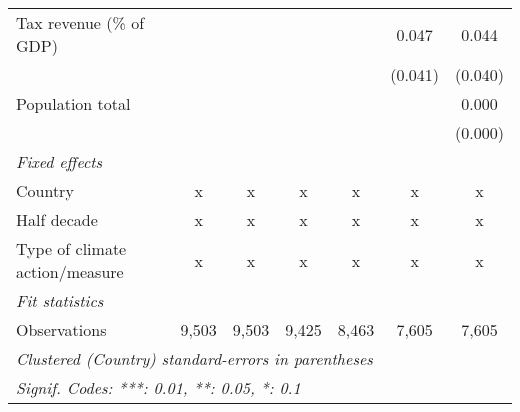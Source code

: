 \begin{tabular}{lcccccc}
   Tax revenue (\% of GDP)                      &         &         &               &              & 0.047       & 0.044\\   
                                                &         &         &               &              & (0.041)     & (0.040)\\   
   Population total                             &         &         &               &              &             & 0.000\\   
                                                &         &         &               &              &             & (0.000)\\   
   \emph{Fixed effects}\\
   Country                                      & x       & x       & x             & x            & x           & x\\  
   Half decade                                  & x       & x       & x             & x            & x           & x\\  
   Type of climate action/measure               & x       & x       & x             & x            & x           & x\\  
   \midrule \emph{Fit statistics}\\
   Observations                                 & 9,503   & 9,503   & 9,425         & 8,463        & 7,605       & 7,605\\  
   \midrule
   \multicolumn{7}{l}{\emph{Clustered (Country) standard-errors in parentheses}}\\
   \multicolumn{7}{l}{\emph{Signif. Codes: ***: 0.01, **: 0.05, *: 0.1}}\\
\end{tabular}
\par\endgroup


